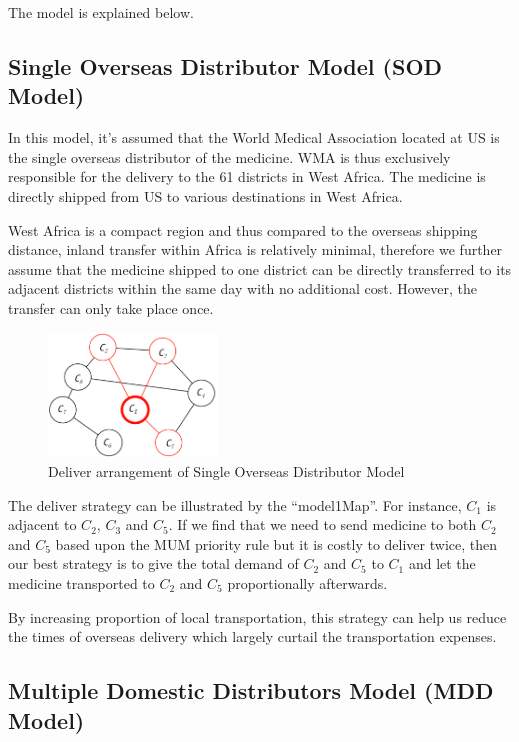 \documentclass[12pt,a4paper,titlepage]{article}
\begin{document}
The model is explained below.

\subsection{Single Overseas Distributor Model (SOD Model)}

In this model, it's assumed that the World Medical Association located at US is the single overseas distributor of the medicine. WMA is thus exclusively responsible for the delivery to the 61 districts in West Africa. The medicine is directly shipped from US to various destinations in West Africa. 

West Africa is a compact region and thus compared to the overseas shipping distance, inland transfer within Africa is relatively minimal, therefore we further assume that the medicine shipped to one district can be directly transferred to its adjacent districts within the same day with no additional cost. However, the transfer can only take place once. 

\begin{figure}[htb]
\centering
\includegraphics[width=0.4\textwidth]{figures/imgSingleModelMap.png}
\caption{\label{MultiDemo}Deliver arrangement of Single Overseas Distributor Model}
\end{figure}

The deliver strategy can be illustrated by the “model1Map”. For instance, $C_1$ is adjacent to $C_2$, $C_3$ and $C_5$. If we find that we need to send medicine to both $C_2$ and $C_5$ based upon the MUM priority rule but it is costly to deliver twice, then our best strategy is to give the total demand of $C_2$ and $C_5$ to $C_1$ and let the medicine transported to $C_2$ and $C_5$ proportionally afterwards.

By increasing proportion of local transportation, this strategy can help us reduce the times of overseas delivery which largely curtail the transportation expenses.

\subsection{Multiple Domestic Distributors Model (MDD Model)}
\end{document}
